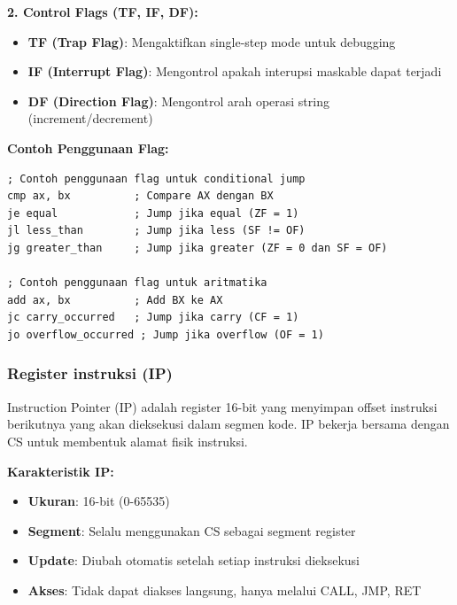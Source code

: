 \documentclass[../main.tex]{subfiles}
\begin{document}
\textbf{2. Control Flags (TF, IF, DF):}
\begin{itemize}
    \item \textbf{TF (Trap Flag)}: Mengaktifkan single-step mode untuk debugging
    \item \textbf{IF (Interrupt Flag)}: Mengontrol apakah interupsi maskable dapat terjadi
    \item \textbf{DF (Direction Flag)}: Mengontrol arah operasi string (increment/decrement)
\end{itemize}

\textbf{Contoh Penggunaan Flag:}
\begin{lstlisting}[language={[x86masm]Assembler}, caption=Penggunaan Flag untuk Conditional Jump, label=lst:flag-usage]
; Contoh penggunaan flag untuk conditional jump
cmp ax, bx          ; Compare AX dengan BX
je equal            ; Jump jika equal (ZF = 1)
jl less_than        ; Jump jika less (SF != OF)
jg greater_than     ; Jump jika greater (ZF = 0 dan SF = OF)

; Contoh penggunaan flag untuk aritmatika
add ax, bx          ; Add BX ke AX
jc carry_occurred   ; Jump jika carry (CF = 1)
jo overflow_occurred ; Jump jika overflow (OF = 1)
\end{lstlisting}

\subsubsection{Register instruksi (IP)}
Instruction Pointer (IP) adalah register 16-bit yang menyimpan offset instruksi berikutnya yang akan dieksekusi dalam segmen kode. IP bekerja bersama dengan CS untuk membentuk alamat fisik instruksi.

\textbf{Karakteristik IP:}
\begin{itemize}
    \item \textbf{Ukuran}: 16-bit (0-65535)
    \item \textbf{Segment}: Selalu menggunakan CS sebagai segment register
    \item \textbf{Update}: Diubah otomatis setelah setiap instruksi dieksekusi
    \item \textbf{Akses}: Tidak dapat diakses langsung, hanya melalui CALL, JMP, RET
\end{itemize}
\end{document}
